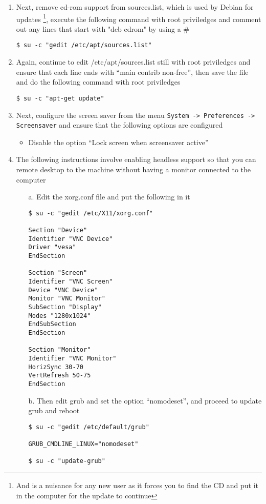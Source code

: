 \begin{enumerate}
\item Next, remove cd-rom support from sources.list, which is used by Debian for updates \footnote{And is a nuisance for any new user
as it forces you to find the CD and put it in the computer for the update to continue}, execute the following command with root priviledges
and comment out any lines that start with "deb cdrom" by using a \#
\lstset{caption=Removing CD-ROM Requirement for Updates}
\begin{lstlisting}
$ su -c "gedit /etc/apt/sources.list"
\end{lstlisting}

\item Again, continue to edit /etc/apt/sources.list still with root priviledges and ensure that each line ends with ``main contrib non-free'',
then save the file and do the following command with root priviledges
\lstset{caption=Updating the System}
\begin{lstlisting}
$ su -c "apt-get update"
\end{lstlisting}

\item Next, configure the screen saver from the menu \verb|System -> Preferences -> Screensaver| and ensure that the following options are 
configured
\begin{itemize}
\item	Disable the option ``Lock screen when screensaver active''
\end{itemize}

\item The following instructions involve enabling headless support so that you can remote desktop to the machine without having a monitor
connected to the computer
\begin{itemize}
\item[a.] Edit the xorg.conf file and put the following in it
\lstset{caption=Configuring Xorg for Headless Support}
\begin{lstlisting}
$ su -c "gedit /etc/X11/xorg.conf"

Section "Device"
Identifier "VNC Device"
Driver "vesa"
EndSection

Section "Screen"
Identifier "VNC Screen"
Device "VNC Device"
Monitor "VNC Monitor"
SubSection "Display"
Modes "1280x1024"
EndSubSection
EndSection

Section "Monitor"
Identifier "VNC Monitor"
HorizSync 30-70
VertRefresh 50-75
EndSection

\end{lstlisting}
	
\item[b.] Then edit grub and set the option ``nomodeset'', and proceed to update grub and reboot
\lstset{caption=Configuring Grub for Headless Support}
\begin{lstlisting}
$ su -c "gedit /etc/default/grub"

GRUB_CMDLINE_LINUX="nomodeset"

$ su -c "update-grub"
\end{lstlisting}
\end{itemize}
\end{enumerate}

